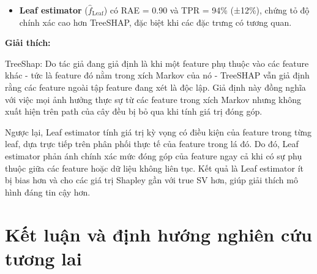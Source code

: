 \documentclass[12pt, a4paper]{article}
\begin{document}
\begin{itemize}[align=parleft, left=4em, labelsep=1em, itemsep=1em]
\begin{itemize}[label=$\circ$, left=1em, labelsep=0.75em, itemsep=0.5em]
                \item \textbf{Leaf estimator} ($\hat{f}_{\text{Leaf}}$) có RAE = 0.90 và TPR = 94\% (±12\%), chứng tỏ độ chính xác cao hơn TreeSHAP, đặc biệt khi các đặc trưng có tương quan.  
              \end{itemize}
            
            

            
           \textbf{Giải thích:} 

             TreeShap: Do tác giả đang giả định là khi một feature phụ thuộc vào các feature khác - tức là feature đó nằm trong xích Markov của nó - TreeSHAP vẫn giả định rằng các feature ngoài tập feature đang xét là độc lập. Giả định này đồng nghĩa với việc mọi ảnh hưởng thực sự từ các feature trong xích Markov nhưng không xuất hiện trên path của cây đều bị bỏ qua khi tính giá trị đóng góp.
                        
            Ngược lại, Leaf estimator tính giá trị kỳ vọng có điều kiện của feature trong từng leaf, dựa trực tiếp trên phân phối thực tế của feature trong lá đó. Do đó, Leaf estimator phản ánh chính xác mức đóng góp của feature ngay cả khi có sự phụ thuộc giữa các feature hoặc dữ liệu không liên tục. Kết quả là Leaf estimator ít bị bias hơn và cho các giá trị Shapley gần với true SV hơn, giúp giải thích mô hình đáng tin cậy hơn.


        
    \end{itemize}




\section{Kết luận và định hướng nghiên cứu tương lai}
\end{document}
